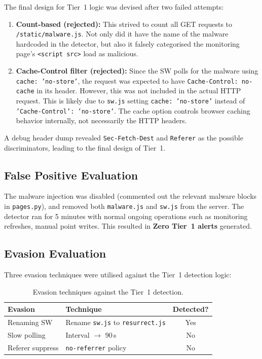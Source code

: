 \documentclass[conference]{IEEEtran}
\begin{document}
The final design for Tier~1 logic was devised after two failed attempts:

\begin{enumerate}
  \item \textbf{Count-based (rejected):} This strived to count all GET requests to \texttt{/static/malware.js}. Not only did it have the name of the malware hardcoded in the detector, but also it falsely categorised the monitoring page's \texttt{<script src>} load as malicious.

  \item \textbf{Cache-Control filter (rejected):} Since the SW polls for the malware using \texttt{cache:~'no-store'}, the request was expected to have \texttt{Cache-Control:~no-cache} in its header. However, this was not included in the actual HTTP request. This is likely due to \texttt{sw.js} setting \texttt{cache:~'no-store'} instead of \texttt{'Cache-Control':~'no-store'}. The cache option controls browser caching behavior internally, not necessarily the HTTP headers.
\end{enumerate}

A debug header dump revealed \texttt{Sec-Fetch-Dest} and
\texttt{Referer} as the possible discriminators, leading to the final design of Tier~1.

\subsection{False Positive Evaluation}

The malware injection was disabled (commented out the relevant malware blocks in \texttt{pages.py}), and removed both \texttt{malware.js} and \texttt{sw.js} from the server. The detector ran for 5 minutes with normal ongoing operations such as monitoring refreshes, manual point writes. This resulted in \textbf{Zero Tier~1 alerts} generated.

\subsection{Evasion Evaluation}

Three evasion techniques were utilised against the Tier~1 detection logic:

\begin{table}[ht]
\centering
\caption{Evasion techniques against the Tier~1 detection.}
\label{tab:evasion}
\small
\begin{tabular}{@{}lp{3.2cm}c@{}}
\toprule
\textbf{Evasion} & \textbf{Technique} & \textbf{Detected?} \\
\midrule
Renaming SW        & Rename \texttt{sw.js} to \texttt{resurrect.js} & Yes \\
Slow polling     & Interval $\to$ 90\,s & No \\
Referer suppress & \texttt{no-referrer} policy & No \\
\bottomrule
\end{tabular}
\end{table}
\end{document}
